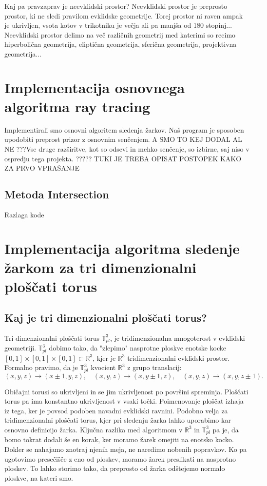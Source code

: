 \documentclass[titlepage]{article}
\begin{document}
Kaj pa pravzaprav je neevklidski prostor?
Neevklidski prostor je preprosto prostor, ki ne sledi pravilom evklidske geometrije. Torej prostor ni raven ampak je ukrivljen, vsota kotov v trikotniku je večja ali pa manjša od 180 stopinj... Neevklidski prostor delimo na več različnih geometrij med katerimi so recimo hiperbolična geometrija, eliptična geometrija, sferična geometrija, projektivna geometrija... 



\section {Implementacija osnovnega algoritma ray tracing}
Implementirali smo osnovni algoritem sledenja žarkov. Naš program je sposoben upodobiti preprost prizor z osnovnim senčenjem. 
A SMO TO KEJ DODAL AL NE ???Vse druge razširitve, kot so odsevi in mehko senčenje, so izbirne, saj niso v ospredju tega projekta. ????? TUKI JE TREBA OPISAT POSTOPEK KAKO ZA PRVO VPRAŠANJE 

\subsection{Metoda Intersection}
Razlaga kode 


\section{Implementacija algoritma sledenje žarkom za tri dimenzionalni ploščati torus} 

\subsection{Kaj je tri dimenzionalni ploščati torus?}
Tri dimenzionalni ploščati torus \( \mathbb{T}^3_{pl} \), je tridimenzionalna mnogoterost v evklidski geometriji. \( \mathbb{T}^3_{pl} \) dobimo tako, da "zlepimo" nasprotne ploskve enotske kocke \([0,1] \times [0,1] \times [0,1] \subset \mathbb{R}^3 \), kjer je \(\mathbb{R}^3\) tridimenzionalni evklidski prostor. Formalno pravimo, da je \( \mathbb{T}^3_{pl} \) kvocient \(\mathbb{R}^3\) z grupo translacij:
\begin{equation}
(x, y, z) \to (x \pm 1, y, z), \quad (x, y, z) \to (x, y \pm 1, z), \quad (x, y, z) \to (x, y, z \pm 1).
\end{equation}

Običajni torusi so ukrivljeni in se jim ukrivljenost po površini spreminja. Ploščati torus pa ima konstantno ukrivljenost v vsaki točki. Poimenovanje ploščat izhaja iz tega, ker je povsod podoben navadni evklidski ravnini. Podobno velja za tridimenzionalni ploščati torus, kjer pri sledenju žarka lahko uporabimo kar osnovno definicijo žarka. Ključna razlika med algoritmom v \( \mathbb{R}^3 \) in \( \mathbb{T}^3_{pl} \) pa je, da bomo tokrat dodali še en korak, ker moramo žarek omejiti na enotsko kocko. Dokler se nahajamo znotraj njenih meja, ne naredimo nobenih popravkov. Ko pa ugotovimo presečišče z eno od ploskev, moramo žarek preslikati na nasprotno ploskev. To lahko storimo tako, da preprosto od žarka odštejemo normalo ploskve, na kateri smo.
\end{document}
